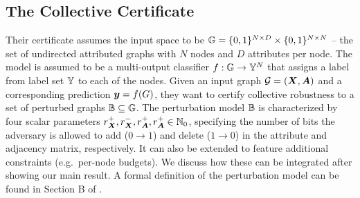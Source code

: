 \subsection{The Collective Certificate}\label{section:schuchardt_summary}
Their certificate assumes the input space to be ${\mathbb{G}} = \{0,1\}^{N \times D} \times \{0,1\}^{N \times N}$ -- the set of undirected attributed graphs with $N$ nodes and $D$ attributes per node.
The model is assumed to be a multi-output classifier $f : {\mathbb{G}} \rightarrow {\mathbb{Y}}^{N}$ that assigns a label from label set ${\mathbb{Y}}$ to each of the nodes.
Given an input graph ${\mathcal{G}} = ({\bm{X}}, {\bm{A}})$ and a corresponding prediction ${\bm{y}} = f(G)$, they want to certify collective robustness to a set of perturbed graphs ${\mathbb{B}} \subseteq {\mathbb{G}}$.
The perturbation model ${\mathbb{B}}$ is characterized by four scalar parameters $r_{\bm{X}}^{+}, r_{\bm{X}}^{-}, r_{\bm{A}}^{+}, r_{\bm{A}}^{+} \in {\mathbb{N}}_0$, specifying the number of bits the adversary is allowed to add ($0 \rightarrow 1$) and delete ($1 \rightarrow 0$) in the attribute and adjacency matrix, respectively.
It can also be extended to feature additional constraints (e.g.~per-node budgets). We discuss how these can be integrated after showing our main result.
A formal definition of the perturbation model can be found in Section B of \citep{Schuchardt2021}.

